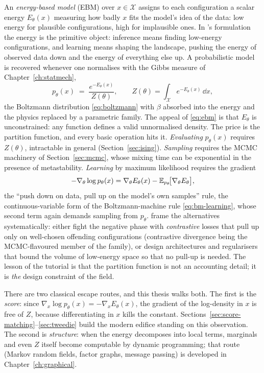 An \emph{energy-based model} (EBM) over $x \in \mathcal{X}$ assigns to
each configuration a scalar energy $E_\theta(x)$ measuring how badly $x$
fits the model's idea of the data: low energy for plausible
configurations, high for implausible ones. In
\citeauthor{lecun2006tutorial}'s formulation the energy is the primitive
object: inference means finding low-energy configurations, and learning
means shaping the landscape, pushing the energy of observed data down and
the energy of everything else up. A probabilistic model is recovered
whenever one normalises with the Gibbs measure of
Chapter~\ref{ch:statmech},
\begin{equation}
  p_\theta(x) \;=\; \frac{e^{-E_\theta(x)}}{Z(\theta)},
  \qquad
  Z(\theta) = \int_{\mathcal{X}} e^{-E_\theta(x)}\, \dd x ,
  \label{eq:ebm}
\end{equation}
the Boltzmann distribution \eqref{eq:boltzmann} with $\beta$ absorbed
into the energy and the physics replaced by a parametric family. The
appeal of \eqref{eq:ebm} is that $E_\theta$ is unconstrained: any
function defines a valid unnormalised density. The price is the
partition function, and every basic operation hits it. \emph{Evaluating}
$p_\theta(x)$ requires $Z(\theta)$, intractable in general
(Section~\ref{sec:ising}). \emph{Sampling} requires the MCMC machinery of
Section~\ref{sec:mcmc}, whose mixing time can be exponential in the
presence of metastability. \emph{Learning} by maximum likelihood requires
the gradient
\begin{equation}
  -\nabla_\theta \log p_\theta(x)
  = \nabla_\theta E_\theta(x)
  - \mathbb{E}_{p_\theta}\!\big[ \nabla_\theta E_\theta \big],
  \label{eq:ebm-gradient}
\end{equation}
the ``push down on data, pull up on the model's own samples'' rule, the
continuous-variable form of the Boltzmann-machine rule
\eqref{eq:bm-learning}, whose second term again demands sampling from
$p_\theta$. \citet{lecun2006tutorial} frame the alternatives
systematically: either fight the negative phase with \emph{contrastive}
losses that pull up only on well-chosen offending configurations
(contrastive divergence \citep{hinton2002training} being the
MCMC-flavoured member of the family), or design architectures and
regularisers that bound the volume of low-energy space so that no pull-up
is needed. The lesson of the tutorial is that the partition function is
not an accounting detail; it is \emph{the} design constraint of the
field.

There are two classical escape routes, and this thesis walks both. The
first is the \emph{score}: since
$\nabla_x \log p_\theta(x) = -\nabla_x E_\theta(x)$, the gradient of the
log-density in $x$ is free of $Z$, because differentiating in $x$ kills
the constant. Sections~\ref{sec:score-matching}--\ref{sec:tweedie} build
the modern edifice standing on this observation. The second is
\emph{structure}: when the energy decomposes into local terms, marginals
and even $Z$ itself become computable by dynamic programming; that route
(Markov random fields, factor graphs, message passing) is developed in
Chapter~\ref{ch:graphical}.


